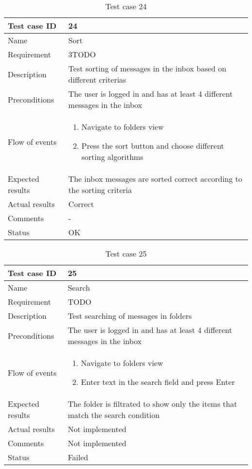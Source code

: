 		\begin{table}
			\begin{tabular}{l|p{10cm}}
				Test case ID & 24 \\ \hline
				Name & Sort\\ \hline
				Requirement & 3TODO\\ \hline
				Description & Test sorting of messages in the inbox based on different criterias\\ \hline
				Preconditions & The user is logged in and has at least 4 different messages in the inbox\\ \hline
				Flow of events & 
					\begin{enumerate}
						\item{}Navigate to folders view 
						\item{}Press the sort button and choose different sorting algorithms
					\end{enumerate} \\ \hline
				Expected results & The inbox messages are sorted correct according to the sorting criteria\\ \hline
				Actual results &Correct\\ \hline
				Comments &-\\ \hline
				Status &OK \\ \hline
			\end{tabular}
			\caption{Test case 24} \label{tab:case24}
		\end{table}

		\begin{table}
			\begin{tabular}{l|p{10cm}}
				Test case ID & 25 \\ \hline
				Name & Search\\ \hline
				Requirement & TODO\\ \hline
				Description & Test searching of messages in folders\\ \hline
				Preconditions & The user is logged in and has at least 4 different messages in the inbox\\ \hline
				Flow of events & 
					\begin{enumerate}
						\item{}Navigate to folders view 
						\item{}Enter text in the search field and press Enter
					\end{enumerate} \\ \hline
				Expected results & The folder is filtrated to show only the items that match the search condition\\ \hline
				Actual results & Not implemented\\ \hline
				Comments & Not implemented\\ \hline
				Status & Failed\\ \hline
			\end{tabular}
			\caption{Test case 25} \label{tab:case25}
		\end{table}

